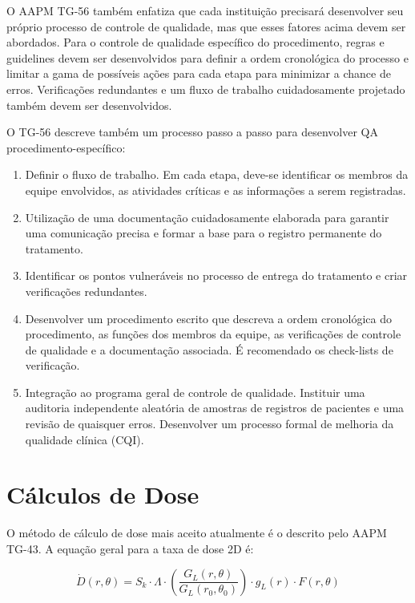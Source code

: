 \documentclass[11pt,a4paper]{article}
\begin{document}
	O AAPM TG-56 também enfatiza que cada instituição precisará desenvolver seu próprio processo de controle de qualidade, mas que esses fatores acima devem ser abordados. Para o controle de qualidade específico do procedimento, regras e guidelines devem ser desenvolvidos para definir a ordem cronológica do processo e limitar a gama de possíveis ações para cada etapa para minimizar a chance de erros. Verificações redundantes e um fluxo de trabalho cuidadosamente projetado também devem ser desenvolvidos. 
	
	O TG-56 descreve também um processo passo a passo para desenvolver QA procedimento-específico:

	\begin{enumerate}[label=\textcolor{CarnationPink}{\arabic*${}^\circ$}]
		\item Definir o fluxo de trabalho. Em cada etapa, deve-se identificar os membros da equipe envolvidos, as atividades críticas e as informações a serem registradas.
		\item Utilização de uma documentação cuidadosamente elaborada para garantir uma comunicação precisa e formar a base para o registro permanente do tratamento.
		\item Identificar os pontos vulneráveis no processo de entrega do tratamento e criar verificações redundantes.
		\item Desenvolver um procedimento escrito que descreva a ordem cronológica do procedimento, as funções dos membros da equipe, as verificações de controle de qualidade e a documentação associada. É recomendado os check-lists de verificação.
		\item Integração ao programa geral de controle de qualidade. Instituir uma auditoria independente aleatória de amostras de registros de pacientes e uma revisão de quaisquer erros. Desenvolver um processo formal de melhoria da qualidade clínica (CQI).
	\end{enumerate}

\section{Cálculos de Dose}

	
	O método de cálculo de dose mais aceito atualmente é o descrito pelo AAPM TG-43. A equação geral para a taxa de dose 2D é:

	$$\dot{D} (r, \theta) = S_{k} \cdot \Lambda \cdot \left(\frac{G_{L}(r, \theta)}{G_{L}(r_0, \theta_0)}\right) \cdot g_{L}(r) \cdot F(r, \theta) $$
\end{document}
